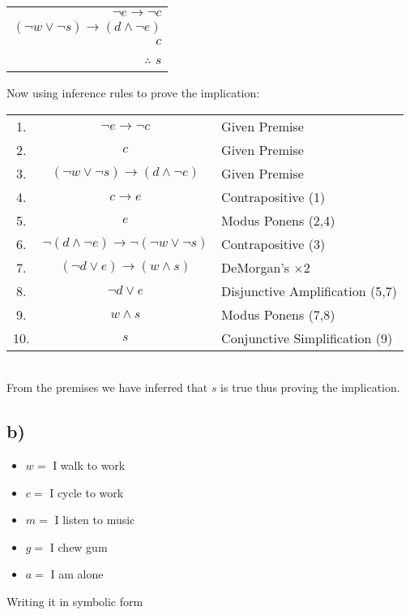 \documentclass{article}
\begin{document}
\begin{table}[htp]
    \centering
    \begin{tabular}{r}
        $\lnot e \rightarrow \lnot c$\\
        $(\lnot w \lor \lnot s)\rightarrow (d \land \lnot e)$\\
        $c$\\
        \hline
        $\therefore$ \;\;$s$
    \end{tabular}
\end{table}
Now using inference rules to prove the implication:
\begin{table}[htp]
    \centering
    \begin{tabular}{ccl}
         1. & $\lnot e \rightarrow \lnot c$& Given Premise\\
         2. & $c$ & Given Premise\\
         3. & $(\lnot w \lor \lnot s)\rightarrow (d \land \lnot e)$ & Given Premise\\
         4. & $c\rightarrow e$ & Contrapositive (1)\\
         5. & $e$ & Modus Ponens (2,4)\\
         6. & $\lnot (d \land \lnot e) \rightarrow \lnot(\lnot w \lor \lnot s)$ & Contrapositive (3)\\
         7. & $(\lnot d\lor e) \rightarrow (w \land s) $ & DeMorgan's $\times 2$\\
         8. & $\lnot d\lor e$ & Disjunctive Amplification (5,7)\\
         9. & $w\land s$ & Modus Ponens (7,8)\\
         10. & $s$ & Conjunctive Simplification (9)
    \end{tabular}
\end{table}\\
From the premises we have inferred that $s$ is true thus proving the implication.
\newpage
\subsection*{b)}
\begin{itemize}
    \item $w = $ I walk to work
    \item $c = $ I cycle to work
    \item $m = $ I listen to music
    \item $g = $ I chew gum
    \item $a = $ I am alone
\end{itemize}
Writing it in symbolic form
\end{document}
